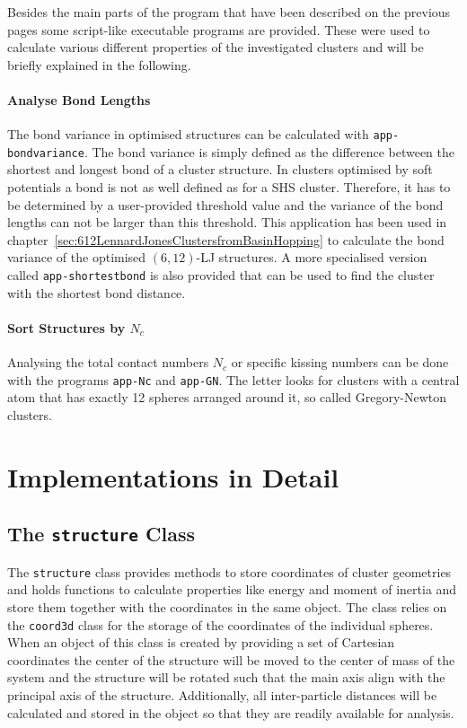 Besides the main parts of the program that have been described on the previous
pages some script-like executable programs are provided. These were used to calculate
various different properties of the investigated clusters and will be briefly
explained in the following.

\paragraph{Analyse Bond Lengths}%
The bond variance in optimised structures can be calculated with
\texttt{app-bondvariance}. The bond variance is simply defined as the
difference between the shortest and longest bond of a cluster structure. In
clusters optimised by soft potentials a bond is not as well defined as for a
\ac{SHS} cluster. Therefore, it has to be determined by a user-provided
threshold value and the variance of the bond lengths can not be larger than
this threshold. This application has been used in
chapter~\ref{sec:612LennardJonesClustersfromBasinHopping} to calculate the bond
variance of the optimised $(6,12)$-\ac{LJ} structures. A more specialised
version called \texttt{app-shortestbond} is also provided that can be used to
find the cluster with the shortest bond distance.

\paragraph{Sort Structures by $N_c$}%

Analysing the total contact numbers $N_c$ or specific kissing numbers can be
done with the programs \texttt{app-Nc} and \texttt{app-GN}. The letter looks
for clusters with a central atom that has exactly 12 spheres arranged around
it, so called Gregory-Newton clusters.



\section{Implementations in Detail}
\label{sec:ImplementationsinDetail}

\subsection{The \texttt{structure} Class}
\label{sec:thestructureclass}

The \verb|structure| class provides methods to store coordinates of cluster
geometries and holds functions to calculate properties like energy and moment
of inertia and store them together with the coordinates in the same object. The
class relies on the \verb|coord3d| class for the storage of the coordinates of
the individual spheres.  When an object of this class is created by providing a
set of Cartesian coordinates the center of the structure will be moved to the
center of mass of the system and the structure will be rotated such that the
main axis align with the principal axis of the structure. Additionally, all
inter-particle distances will be calculated and stored in the object so that
they are readily available for analysis.

